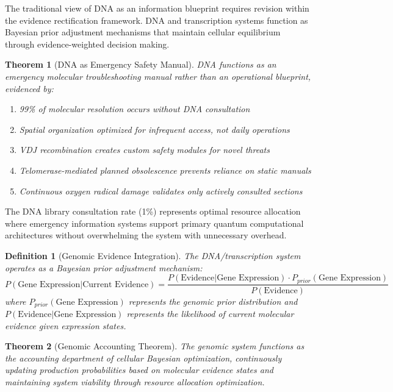 \documentclass[12pt,a4paper]{article}
\newtheorem{theorem}{Theorem}
\newtheorem{definition}{Definition}
\begin{document}
The traditional view of DNA as an information blueprint requires revision within the evidence rectification framework. DNA and transcription systems function as Bayesian prior adjustment mechanisms that maintain cellular equilibrium through evidence-weighted decision making.

\begin{theorem}[DNA as Emergency Safety Manual]
DNA functions as an emergency molecular troubleshooting manual rather than an operational blueprint, evidenced by:
\begin{enumerate}
\item 99\% of molecular resolution occurs without DNA consultation
\item Spatial organization optimized for infrequent access, not daily operations
\item VDJ recombination creates custom safety modules for novel threats
\item Telomerase-mediated planned obsolescence prevents reliance on static manuals
\item Continuous oxygen radical damage validates only actively consulted sections
\end{enumerate}
\end{theorem}

The DNA library consultation rate (1\%) represents optimal resource allocation where emergency information systems support primary quantum computational architectures without overwhelming the system with unnecessary overhead.

\begin{definition}[Genomic Evidence Integration]
The DNA/transcription system operates as a Bayesian prior adjustment mechanism:
\begin{equation}
P(\text{Gene Expression} | \text{Current Evidence}) = \frac{P(\text{Evidence} | \text{Gene Expression}) \cdot P_{prior}(\text{Gene Expression})}{P(\text{Evidence})}
\end{equation}
where $P_{prior}(\text{Gene Expression})$ represents the genomic prior distribution and $P(\text{Evidence} | \text{Gene Expression})$ represents the likelihood of current molecular evidence given expression states.
\end{definition}

\begin{theorem}[Genomic Accounting Theorem]
The genomic system functions as the accounting department of cellular Bayesian optimization, continuously updating production probabilities based on molecular evidence states and maintaining system viability through resource allocation optimization.
\end{theorem}
\end{document}
